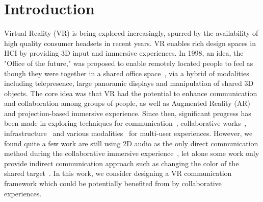 \documentclass{sigchi}
\begin{document}
\section{Introduction}
Virtual Reality (VR) is being explored increasingly, spurred by the availability of high quality consumer headsets in recent years. VR enables rich design spaces in HCI by providing 3D input and immersive experiences. In 1998, an idea, the "Office of the future," was proposed to enable remotely located people to feel as though they were together in a shared office space~\cite{raskar1998office}, via a hybrid of modalities including telepresence, large panoramic displays and manipulation of shared 3D objects. The core idea was that VR had the potential to enhance communication and collaboration among groups of people, as well as Augmented Reality (AR) and projection-based immersive experience. Since then, significant progress has been made in exploring techniques for communication~\cite{ishii1993integration, otsuka2016mmspace}, collaborative works~\cite{kunert2014photoportals,tang2010three}, infrastructure~\cite{maimone2013general, o2011blended, thomas2014muvr} and various modalities~\cite{follmer2013inform, leithinger2014physical, leithinger2015shape, nakagaki2019inforce} for multi-user experiences. However, we found quite a few work are still using 2D audio as the only direct communication method during the collaborative immersive experience~\cite{xia2018spacetime}, let alone some work only provide indirect communication approach such as changing the color of the shared target~\cite{huo2018synchronizar}. In this work, we consider designing a VR communication framework which could be potentially benefited from by collaborative experiences.
\end{document}
